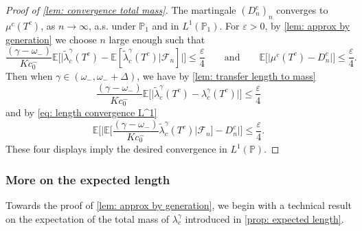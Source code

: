 \documentclass[12pt]{article}
\numberwithin{equation}{section}
\theoremstyle{plain}
\theoremstyle{definition}
\begin{document}
\begin{proof}[Proof of \cref{lem: convergence total mass}]
The martingale $(D^c_n)_n$ converges to $\mu^c(T^c)$, as  $n\to\infty$, a.s. under $\mathbb{P}_1$ and in $L^1(\mathbb{P}_1)$. For $\varepsilon > 0$, by \cref{lem: approx by generation} we choose $n$ large enough such that
\[\frac{(\gamma-\omega_-)}{Kc_0^-}\mathbb{E}\bigg[\Big|\tilde{\lambda}^{\gamma}_c(T^c) - \mathbb{E}[\tilde{\lambda}^{\gamma}_c(T^c)| \mathcal{F}_n]\Big|\bigg]\leq \frac{\varepsilon}{4} \qquad \mbox{and} \qquad \mathbb{E}\Big[\Big|\mu^c(T^c) - D^c_n\Big|\Big]\leq \frac{\varepsilon}{4}. \]
Then when $\gamma\in(\omega_-, \omega_- + \Delta)$, we have by \cref{lem: transfer length to mass}
\[\frac{(\gamma-\omega_-)}{Kc_0^-}\mathbb{E}\Big[\Big|\tilde{\lambda}^{\gamma}_c(T^c)-\lambda^{\gamma}_c(T^c)\Big|\Big]\leq \frac{\varepsilon}{4}\]
and by \eqref{eq: length convergence L^1}
\[
\mathbb{E}\Bigg[\Bigg|\mathbb{E}\bigg[\frac{(\gamma-\omega_-)}{Kc_0^-}\tilde{\lambda}^{\gamma}_c(T^c)\bigg| \mathcal{F}_n\bigg]-D^c_n\Bigg|\Bigg]\leq \frac{\varepsilon}{4}.
\]
These four displays imply the desired convergence in $L^{1}(\mathbb{P})$.
\end{proof}

\subsubsection{More on the expected length}\label{sec: expected length}

Towards the proof of \cref{lem: approx by generation}, we begin with a technical result on the expectation of the total mass of $\lambda^{\gamma}_c$ introduced in \cref{prop: expected length}.
\end{document}
